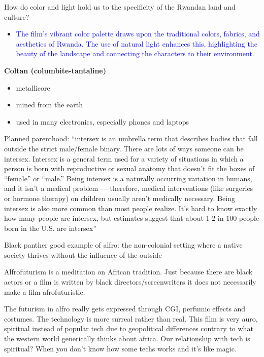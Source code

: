 \documentclass[11pt,fleqn]{book} %
\begin{document}
\begin{exercise}
How do color and light hold us to the specificity of the Rwandan land and culture?
\begin{itemize}
\item \textcolor{blue}{The film's vibrant color palette draws upon the traditional colors, fabrics, and aesthetics of Rwanda. The use of natural light enhances this, highlighting the beauty of the landscape and connecting the characters to their environment.}
\end{itemize}
\end{exercise}

\textbf{Coltan (columbite-tantaline)}
\begin{itemize}
    \item metallicore
    \item mined from the earth
    \item used in many electronics, especially phones and laptops
\end{itemize}


Planned parenthood: \enquote{intersex is an umbrella term that describes bodies that fall outside the strict
male/female binary. There are lots of ways someone can be intersex.
Intersex is a general term used for a variety of situations in which a person is
born with reproductive or sexual anatomy that doesn’t fit the boxes of “female”
or “male.”
Being intersex is a naturally occurring variation in humans, and it isn’t a medical
problem — therefore, medical interventions (like surgeries or hormone therapy)
on children usually aren’t medically necessary. Being intersex is also more
common than most people realize. It’s hard to know exactly how many people
are intersex, but estimates suggest that about 1-2 in 100 people born in the U.S.
are intersex}

\begin{remark}
    Black panther good example of alfro: the non-colonial setting where a native society thrives without the influence of the outside
\end{remark}
\begin{remark}
    Alfrofuturism is a meditation on African tradition. Just because there are black actors or a film is written by black directors/screenwriters it does not necessarily make a film afrofuturistic.
\end{remark}
\begin{remark}
    The futurism in alfro really gets expressed through CGI, perfumic effects and costumes. The technology is more surreal rather than real. This film is very auro, spiritual instead of popular tech due to geopolitical differences contrary to what the western world generically thinks about africa. Our relationship with tech is spiritual? When you don't know how some techs works and it's like magic.
\end{remark}
\end{document}
